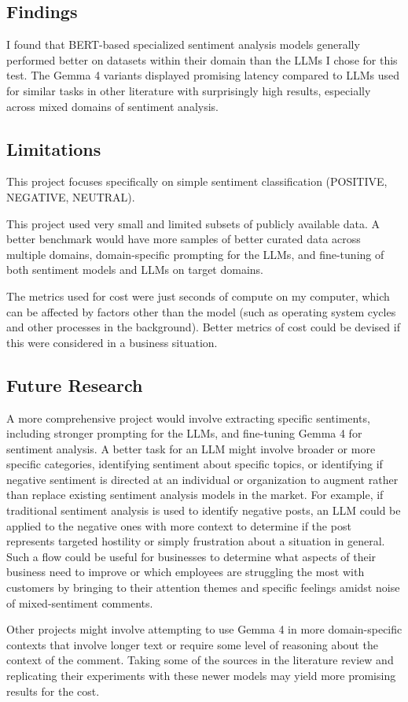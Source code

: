 \documentclass[11pt,table,xcdraw]{article}
\begin{document}
\subsection{Findings}
I found that BERT-based specialized sentiment analysis models generally performed better on datasets within their domain than the LLMs I chose for this test. The Gemma 4 variants displayed promising latency compared to LLMs used for similar tasks in other literature with surprisingly high results, especially across mixed domains of sentiment analysis.

\subsection{Limitations}
This project focuses specifically on simple sentiment classification (POSITIVE, NEGATIVE, NEUTRAL).

This project used very small and limited subsets of publicly available data. A better benchmark would have more samples of better curated data across multiple domains, domain-specific prompting for the LLMs, and fine-tuning of both sentiment models and LLMs on target domains.

The metrics used for cost were just seconds of compute on my computer, which can be affected by factors other than the model (such as operating system cycles and other processes in the background). Better metrics of cost could be devised if this were considered in a business situation.

\subsection{Future Research}
A more comprehensive project would involve extracting specific sentiments, including stronger prompting for the LLMs, and fine-tuning Gemma 4 for sentiment analysis. A better task for an LLM might involve broader or more specific categories, identifying sentiment about specific topics, or identifying if negative sentiment is directed at an individual or organization to augment rather than replace existing sentiment analysis models in the market. For example, if traditional sentiment analysis is used to identify negative posts, an LLM could be applied to the negative ones with more context to determine if the post represents targeted hostility or simply frustration about a situation in general. Such a flow could be useful for businesses to determine what aspects of their business need to improve or which employees are struggling the most with customers by bringing to their attention themes and specific feelings amidst noise of mixed-sentiment comments.

Other projects might involve attempting to use Gemma 4 in more domain-specific contexts that involve longer text or require some level of reasoning about the context of the comment. Taking some of the sources in the literature review and replicating their experiments with these newer models may yield more promising results for the cost.



\end{document}
